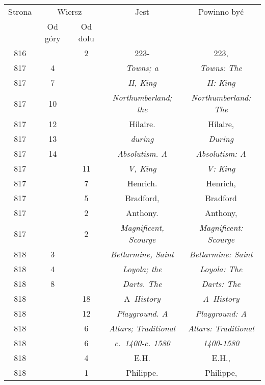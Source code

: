 \documentclass[a4paper,11pt]{article}
\numberwithin{equation}{section}
\begin{document}
\begin{center}
  \newpage

  \begin{tabular}{|c|c|c|c|c|}
    \hline
    Strona & \multicolumn{2}{c|}{Wiersz} & Jest
                              & Powinno być \\ \cline{2-3}
    & Od góry & Od dołu & & \\
    \hline
    816 & & \hphantom{0}2 & 223- & 223, \\
    817 & \hphantom{0}4 & & \textit{Towns; a} & \textit{Towns: The} \\
    817 & \hphantom{0}7 & & \textit{II, King} & \textit{II: King} \\
    817 & 10 & & \textit{Northumberland; the}
           & \textit{Northumberland: The} \\
    817 & 12 & & Hilaire. & Hilaire, \\
    817 & 13 & & \textit{during} & \textit{During} \\
    817 & 14 & & \textit{Absolutism. A} & \textit{Absolutism: A} \\
    817 & & 11 & \textit{V, King} & \textit{V: King} \\
    817 & & \hphantom{0}7 & Henrich. & Henrich, \\
    817 & & \hphantom{0}5 & Bradford, & Bradford \\
    817 & & \hphantom{0}2 & Anthony. & Anthony, \\
    817 & & \hphantom{0}2 & \textit{Magnificent, Scourge}
    & \textit{Magnificent: Scourge} \\
    818 & \hphantom{0}3 & & \textit{Bellarmine, Saint}
    & \textit{Bellarmine: Saint} \\
    818 & \hphantom{0}4 & & \textit{Loyola; the} & \textit{Loyola: The} \\
    818 & \hphantom{0}8 & & \textit{Darts. The} & \textit{Darts: The} \\
    818 & & 18 & A~\textit{History} & \textit{A~History} \\
    818 & & 12 & \textit{Playground. A} & \textit{Playground: A} \\
    818 & & \hphantom{0}6 & \textit{Altars; Traditional}
    & \textit{Altars: Traditional} \\
    818 & & \hphantom{0}6 & \textit{c.~1400-c. 1580} & \textit{1400-1580} \\
    818 & & \hphantom{0}4 & E.H. & E.H., \\
    818 & & \hphantom{0}1 & Philippe. & Philippe, \\

\end{tabular}
\end{center}
\end{document}
